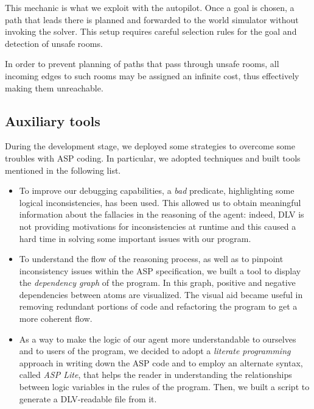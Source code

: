 \documentclass{llncs}
\begin{document}
This mechanic is what we exploit with the autopilot. Once a goal is chosen, a path that leads there is planned and forwarded to the world simulator without invoking the solver. This setup requires careful selection rules for the goal and detection of unsafe rooms.

In order to prevent planning of paths that pass through unsafe rooms, all incoming edges to such rooms may be assigned an infinite cost, thus effectively making them unreachable.


\subsection{Auxiliary tools}

During the development stage, we deployed some strategies to overcome some troubles with ASP coding. In particular, we adopted techniques and built tools mentioned in the following list.

\begin{itemize}
	\item To improve our debugging capabilities, a \emph{bad} predicate, highlighting some logical inconsistencies, has been used.
	This allowed us to obtain meaningful information about the fallacies in the reasoning of the agent: indeed, DLV is not providing motivations for inconsistencies at runtime and this caused a hard time in solving some important issues with our program.
	\item To understand the flow of the reasoning process, as well as to pinpoint inconsistency issues within the ASP specification, we built a tool to display the \emph{dependency graph} of the program.
	In this graph, positive and negative dependencies between atoms are visualized.
	The visual aid became useful in removing redundant portions of code and refactoring the program to get a more coherent flow.
	\item As a way to make the logic of our agent more understandable to ourselves and to users of the program, we decided to adopt a \emph{literate programming} approach in writing down the ASP code and to employ an alternate syntax, called \emph{ASP Lite}, that helps the reader in understanding the relationships between logic variables in the rules of the program.
	Then, we built a script to generate a DLV-readable file from it. 
\end{itemize}
\end{document}
